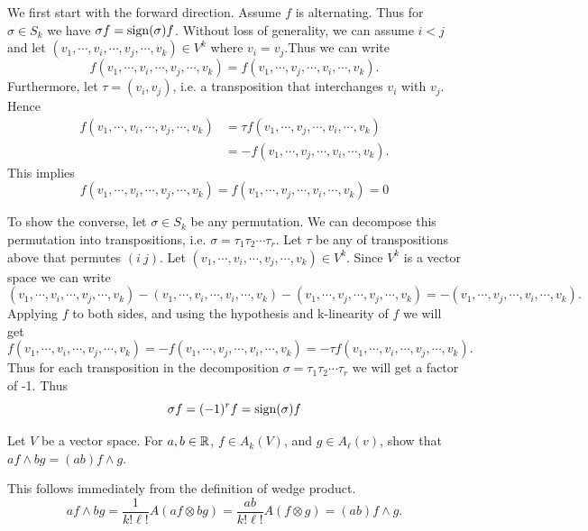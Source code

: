 \begin{solution}
	We first start with the forward direction. Assume $ f $ is alternating. Thus for $ \sigma \in S_k $ we have $ \sigma f = \operatorname{sign}(\sigma) f $. Without loss of generality, we can assume $ i < j $ and let $ (v_1,\cdots,v_i,\cdots,v_j,\cdots,v_k) \in V^k$ where $ v_i = v_j $.Thus we can write
	\[ f(v_1,\cdots,v_i,\cdots,v_j,\cdots,v_k) = f(v_1,\cdots,v_j,\cdots,v_i,\cdots,v_k). \]
	Furthermore,  let $ \tau = (v_i, v_j) $, i.e. a transposition that interchanges $ v_i $ with $ v_j $. Hence
	\begin{align*}
		f(v_1,\cdots,v_i,\cdots,v_j,\cdots,v_k) &= \tau f(v_1,\cdots,v_j,\cdots,v_i,\cdots,v_k) \\
		&=- f(v_1,\cdots,v_j,\cdots,v_i,\cdots,v_k).
	\end{align*}
	This implies 
	\[ f(v_1,\cdots,v_i,\cdots,v_j,\cdots,v_k) = f(v_1,\cdots,v_j,\cdots,v_i,\cdots,v_k) = 0 \]
	
	To show the converse, let $ \sigma \in S_k $ be any permutation. We can decompose this permutation into transpositions, i.e. $ \sigma = \tau_1 \tau_2 \cdots \tau_r $. Let $ \tau $ be any of transpositions above that permutes $ (i\ j) $. Let $ (v_1,\cdots,v_i,\cdots,v_j,\cdots,v_k) \in V^k $. Since $ V^k $ is a vector space we can write
	\[ (v_1,\cdots,v_i,\cdots,v_j,\cdots,v_k) - (v_1,\cdots,v_i,\cdots,v_i,\cdots,v_k) - (v_1,\cdots,v_j,\cdots,v_j,\cdots,v_k) = -(v_1,\cdots,v_j,\cdots,v_i,\cdots,v_k). \]
	Applying $ f $ to both sides, and using the hypothesis and k-linearity of $ f $ we will get
	\[ f(v_1,\cdots,v_i,\cdots,v_j,\cdots,v_k) = - f(v_1,\cdots,v_j,\cdots,v_i,\cdots,v_k) = - \tau f (v_1,\cdots,v_i,\cdots,v_j,\cdots,v_k). \]
	Thus for each transposition in the decomposition $ \sigma = \tau_1 \tau_2 \cdots \tau_r $ we will get a factor of -1. Thus
	\[ \sigma f = (-1)^r f = \operatorname{sign}(\sigma) f \]
\end{solution}

\begin{problem}
	Let $ V $ be a vector space. For $ a,b\in \mathbb{R} $, $ f \in A_k(V) $, and $ g \in A_\ell(v) $, show that $ af\wedge bg = (ab) f\wedge g $.
\end{problem}
\begin{solution}
	This follows immediately from the definition of wedge product.
	\[ af \wedge bg = \frac{1}{k! \ell!} A\left( af \otimes bg \right) = \frac{ab}{k! \ell!} A(f\otimes g) = (ab) f\wedge g. \]
\end{solution}

